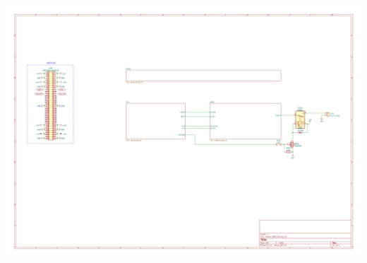 \documentclass[11pt, a4paper, listof=numbered, captions=tableheading, headinclude, table, xcdraw]{scrreprt}
\begin{document}
\includegraphics[page=4,angle=90,width=\textwidth]{schematics/Power_SMPS.pdf}
\end{document}
